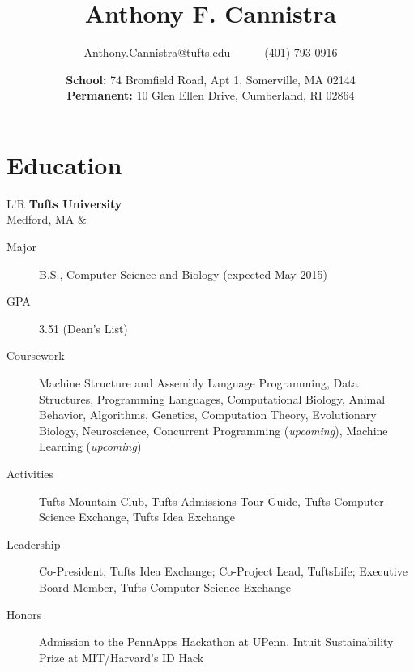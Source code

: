 \documentclass[10pt, letter]{article}
\title{\vspace{-80pt}\bfseries Anthony F. Cannistra\vspace{-10pt}}
\author{Anthony.Cannistra@tufts.edu~~~~~~(401) 793-0916}
\date{\vspace{-6pt}\small{
\textbf{School:} 74 Bromfield Road, Apt 1, Somerville, MA 02144\\
\textbf{Permanent:} 10 Glen Ellen Drive, Cumberland, RI 02864
\vspace{-20pt}
}
}
\newcommand\VRule{\color{lightgray}\vrule width 0.5pt}
\begin{document}
\maketitle
\thispagestyle{empty}

\section*{Education}
\begin{tabular}{L!{\VRule}R}
\textbf{Tufts University} \\ Medford, MA &
\vspace{-16.7pt}
\begin{description}
\item[Major] B.S., Computer Science and Biology (expected May 2015)
\item[GPA] 3.51 (Dean's List)
\item[Coursework] Machine Structure and Assembly Language Programming, Data Structures, Programming Languages, Computational Biology, Animal Behavior, Algorithms, Genetics, Computation Theory, Evolutionary Biology, Neuroscience, Concurrent Programming (\emph{upcoming}), Machine Learning (\emph{upcoming})
\item[Activities] Tufts Mountain Club, Tufts Admissions Tour Guide, Tufts Computer Science Exchange, Tufts Idea Exchange
\item[Leadership] Co-President, Tufts Idea Exchange; Co-Project Lead, TuftsLife; Executive Board Member, Tufts Computer Science Exchange
\item[Honors] Admission to the PennApps Hackathon at UPenn, Intuit Sustainability Prize at MIT/Harvard's ID Hack
\end{description} \\
\end{tabular}

\vspace{-15pt}
\end{document}
